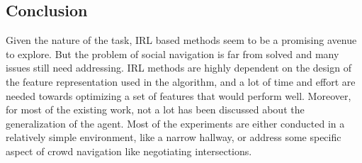 \subsection*{Conclusion}
Given the nature of the task, IRL based methods seem to be a promising avenue to explore. But the problem of social navigation is far from solved and many issues still need addressing. IRL methods are highly dependent on the design of the feature representation used in the algorithm, and a lot of time and effort are needed towards optimizing a set of features that would perform well. Moreover, for most of the existing work, not a lot has been discussed about the generalization of the agent. Most of the experiments are either conducted in a relatively simple environment, like a narrow hallway, or address some specific aspect of crowd navigation like negotiating intersections. 

